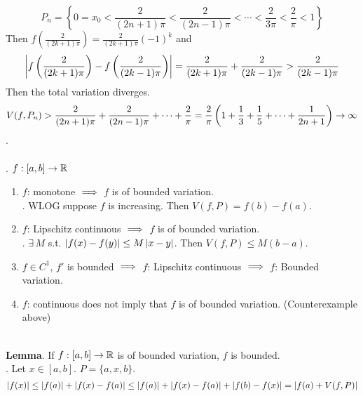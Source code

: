 $$P_n = \left\{0 = x_0 <\frac{2}{(2n+1)\pi} <\frac{2}{(2n-1)\pi} < \cdots < \frac{2}{3\pi} < \frac{2}{\pi} < 1 \right\}$$
Then $f(\frac{2}{(2k+1)\pi}) = \frac{2}{(2k+1)\pi} (-1)^k$ and $$\left|f\left(\frac{2}{(2k+1)\pi}\right) - f\left(\frac{2}{(2k-1)\pi}\right)\right| = \frac{2}{(2k+1)\pi} + \frac{2}{(2k-1)\pi} > \frac{2}{(2k-1)\pi}$$
Then the total variation diverges. $$V(f, P_n) > \frac{2}{(2n+1)\pi} + \frac{2}{(2n-1)\pi} + \cdots + \frac{2}{\pi} = \frac{2}{\pi} \left(1+\frac{1}{3} + \frac{1}{5} + \cdots + \frac{1}{2n+1}\right) \rightarrow \infty$$.\\
\\
\ex. $f:[a, b]\rightarrow\mathbb{R}$
\begin{enumerate}
	\item $f$: monotone $\implies$ $f$ is of bounded variation.\\
	\pf. WLOG suppose $f$ is increasing. Then $V(f, P) = f(b)-f(a)$.
	\item $f$: Lipschitz continuous $\implies$ $f$ is of bounded variation.\\
	\pf. $\exists\, M$ s.t. $\left|f(x) - f(y)\right| \leq M\left|x-y\right|$. Then $V(f, P) \leq M(b-a)$.
	\item $f\in C^1$, $f'$ is bounded $\implies$ $f$: Lipschitz continuous $\implies $ $f$: Bounded variation.
	\item $f$: continuous does not imply that $f$ is of bounded variation. (Counterexample above)
\end{enumerate}~\\
\textbf{Lemma}. If $f:[a, b]\rightarrow\mathbb{R}$ is of bounded variation, $f$ is bounded.\\
\pf. Let $x\in[a, b]$. $P = \{a, x, b\}$.$$\left|f(x)\right| \leq \left|f(a)\right| + \left|f(x)-f(a)\right| \leq \left|f(a)\right| + \left|f(x) - f(a)\right| + \left|f(b)-f(x)\right| = \left|f(a) + V(f, P)\right|$$
\pagebreak